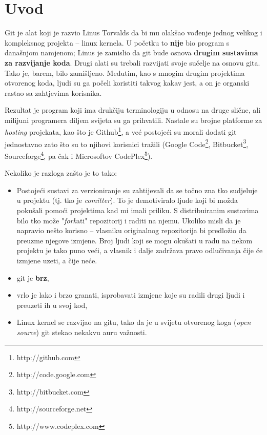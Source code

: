 \chapter*{Uvod}

Git je alat koji je razvio Linus Torvalds da bi mu olakšao vođenje jednog velikog i kompleksnog projekta -- linux kernela.
U početku to \textbf{nije} bio program s današnjom namjenom; Linus je zamislio da git bude osnova \textbf{drugim sustavima za razvijanje koda}.
Drugi alati su trebali razvijati svoje sučelje na osnovu gita.
Tako je, barem, bilo zamišljeno.
Međutim, kao s mnogim drugim projektima otvorenog koda, ljudi su ga počeli koristiti takvog kakav jest, a on je organski rastao sa zahtjevima korisnika.

Rezultat je program koji ima drukčiju terminologiju u odnosu na druge slične, ali milijuni programera diljem svijeta su ga prihvatili. 
Nastale su brojne platforme za \emph{hosting} projekata, kao što je Github\footnote{http://github.com}, a već postojeći su morali dodati git jednostavno zato što su to njihovi korisnici tražili (Google Code\footnote{http://code.google.com}, Bitbucket\footnote{http://bitbucket.com}, Sourceforge\footnote{http://sourceforge.net}, pa čak i Microsoftov CodePlex\footnote{http://www.codeplex.com}).

Nekoliko je razloga zašto je to tako:

\begin{itemize}
	\item Postojeći sustavi za verzioniranje su zahtijevali da se točno zna tko sudjeluje u projektu (tj. tko je \emph{comitter}). %
    To je demotiviralo ljude koji bi možda pokušali pomoći projektima kad mi imali priliku. %
    S distribuiranim sustavima bilo tko može "\emph{fork}ati" repozitorij i raditi na njemu. %
    Ukoliko misli da je napravio nešto korisno -- vlasniku originalnog repozitorija bi predložio da preuzme njegove izmjene. %
    Broj ljudi koji se mogu okušati u radu na nekom projektu je tako puno veći, a vlasnik i dalje zadržava pravo odlučivanja čije će izmjene uzeti, a čije neće.
	\item git je \textbf{brz},
	\item vrlo je lako i brzo granati, isprobavati izmjene koje su radili drugi ljudi i preuzeti ih u svoj kod,
	\item Linux kernel se razvijao na gitu, tako da je u svijetu otvorenog koga (\emph{open source}) git stekao nekakvu auru važnosti.
\end{itemize}

